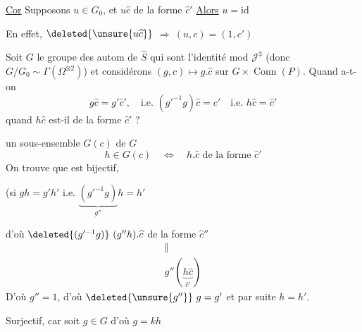 \uline{Cor} Supposons $u\in G_0$,  et $u\widehat c$ de la forme $\widehat c'$
\uline{Alors} $u=\mathrm{id}$

En effet, $\deleted{\unsure{u\widehat c}}$  $\Rightarrow\ (u,c)=(1,c')$

Soit $G$ le groupe des autom  de $\widehat S$ qui sont l'identité mod $\mathcal J^3$ (donc $G/G_0\sim\Gamma(\Omega^{\otimes2})$) et considérons $(g,c)\longmapsto g.\widehat c$ sur $G\times\operatorname{Conn}(P)$. Quand a-t-on
\[
g\widehat c=g'\widehat c',\quad\text{i.e. }(g'^{-1}g)\widehat c=c'\quad\text{i.e. }h\widehat c=\widehat c'
\]
quand $h\widehat c$ est-il de la forme $\widehat c'$ ?

  un sous-ensemble $G(c)$ de $G$
\[
h\in G(c)\quad\Longleftrightarrow\quad h.\widehat c\text{ de la forme }\widehat c'
\]
On trouve que
est bijectif,

(si $gh=g'h'$ i.e. $\underbrace{(g'^{-1}g)}_{g''}h=h'$

d'où $\deleted{(g'^{-1}g)}\ (g''h).\widehat c$ de la forme $\widehat c''$
\[
\begin{array}{c}
\Vert\\
g''(\underbrace{h\widehat c}_{\widehat c'})
\end{array}
\]
D'où $g''=1$, d'où $\deleted{\unsure{g''}}\ g=g'$ et par suite $h=h'$.

 Surjectif, car soit $g\in G$
d'où $g=kh$
